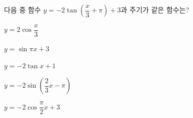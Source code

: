다음 중 함수 $y=-2\tan\left(\dfrac{x}{3}+\pi\right)+3$과 주기가 같은 함수는?
\begin{choicesii}{\rule[-3ex]{0pt}{8ex}$y=2\cos\dfrac{x}{3}$}{\rule[-3ex]{0pt}{8ex}$y=\sin\pi x+3$}{\rule[-3ex]{0pt}{8ex}$y=-2\tan x+1$}{\rule[-3ex]{0pt}{8ex}$y=-2\sin\left(\dfrac{2}{3}x-\pi\right)$}{\rule[-3ex]{0pt}{8ex}$y=-2\cos\dfrac{\pi}{2}x+3$}\end{choicesii}
